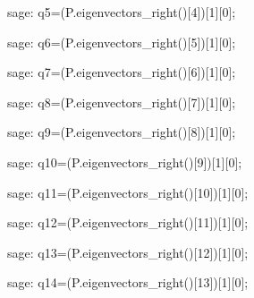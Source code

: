 \begin{sagecommandline}
    sage: q5=(P.eigenvectors_right()[4])[1][0];
\end{sagecommandline}

\begin{sagecommandline}
    sage: q6=(P.eigenvectors_right()[5])[1][0];
\end{sagecommandline}

\begin{sagecommandline}
    sage: q7=(P.eigenvectors_right()[6])[1][0];
\end{sagecommandline}

\begin{sagecommandline}
    sage: q8=(P.eigenvectors_right()[7])[1][0];
\end{sagecommandline}

\begin{sagecommandline}
    sage: q9=(P.eigenvectors_right()[8])[1][0];
\end{sagecommandline}

\begin{sagecommandline}
    sage: q10=(P.eigenvectors_right()[9])[1][0];
\end{sagecommandline}

\begin{sagecommandline}
    sage: q11=(P.eigenvectors_right()[10])[1][0];
\end{sagecommandline}

\begin{sagecommandline}
    sage: q12=(P.eigenvectors_right()[11])[1][0];
\end{sagecommandline}

\begin{sagecommandline}
    sage: q13=(P.eigenvectors_right()[12])[1][0];
\end{sagecommandline}

\begin{sagecommandline}
    sage: q14=(P.eigenvectors_right()[13])[1][0];
\end{sagecommandline}

